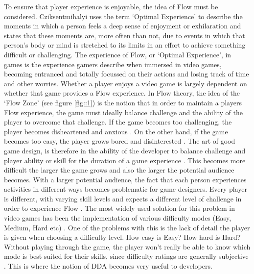\documentclass[journal]{IEEEtran}
\begin{document}
To ensure that player experience is enjoyable, the idea of Flow must be considered. Cziksentmihalyi \cite{czikszentmihalyi1990flow} \cite{csikszentmihalyi2014toward} uses the term `Optimal Experience' to describe the moments in which a person feels a deep sense of enjoyment or exhilaration and states that these moments are, more often than not, due to events in which that person's body or mind is stretched to its limits in an effort to achieve something difficult or challenging.
The experience of Flow, or `Optimal Experience', in games is the experience gamers describe when immersed in video games, becoming entranced and totally focussed on their actions and losing track of time and other worries. Whether a player enjoys a video game is largely dependent on whether that game provides a Flow experience. In Flow theory, the idea of the `Flow Zone' (see figure \ref{fig::1}) is the notion that in order to maintain a players Flow experience, the game must ideally balance challenge and the ability of the player to overcome that challenge. If the game becomes too challenging, the player becomes disheartened and anxious \cite{gilleade2004using}. On the other hand, if the game becomes too easy, the player grows bored and disinterested \cite{chanel2008boredom}. The art of good game design, is therefore in the ability of the developer to balance challenge and player ability or skill for the duration of a game experience \cite{koster2013theory}. This becomes more difficult the larger the game grows and also the larger the potential audience becomes. With a larger potential audience, the fact that each person experiences activities in different ways becomes problematic for game designers. Every player is different, with varying skill levels and expects a different level of challenge in order to experience Flow \cite{czikszentmihalyi1990flow}. The most widely used solution for this problem in video games has been the implementation of various difficulty modes (Easy, Medium, Hard etc) \cite{alexander2013investigation}. One of the problems with this is the lack of detail the player is given when choosing a difficulty level. How easy is Easy? How hard is Hard? Without playing through the game, the player won't really be able to know which mode is best suited for their skills, since difficulty ratings are generally subjective \cite{qin2009effects}. This is where the notion of DDA becomes very useful to developers.
\end{document}

